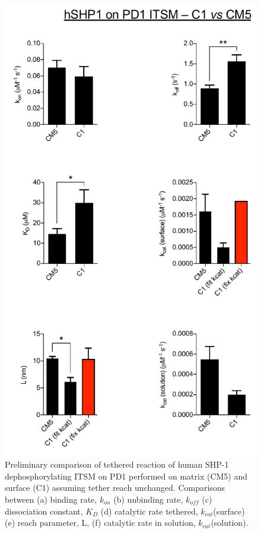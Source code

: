 \documentclass[../../AdvancementSummary.tex]{subfiles}
\begin{document}
\begin{figure}[H]
	\begin{center}
		\includegraphics[scale=0.5]{ResultsFigures/ExperimentalDataPlots/hSHP1_on_PD1_ITSM_CM5_vs_C1.pdf}
	\end{center}
	\caption{Preliminary comparison of tethered reaction of human SHP-1 dephosphorylating ITSM on PD1 performed on matrix (CM5) and surface (C1) assuming tether reach unchanged. Comparisons between (a) binding rate, $k_{on}$ (b) unbinding rate, $k_{off}$ (c) dissociation constant, $K_D$ (d) catalytic rate tethered, $k_{cat}$(surface) (e) reach parameter, L, (f) catalytic rate in solution, $k_{cat}$(solution).}
\end{figure}
\end{document}
